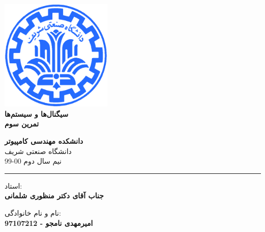 \documentclass[12pt]{article}
\begin{document}
\begin{titlepage}
\begin{center}
        
\vspace*{0.7cm}

\includegraphics[width=0.4\textwidth]{sharif1.png}\\
\vspace{0.5cm}
\textbf{ \Huge{\emph ‌سیگنال‌ها و سیستم‌ها} }\\
\vspace{0.5cm}
\textbf{ \Large{ تمرین سوم} }
\vspace{0.2cm}
       
 
      \large \textbf{دانشکده مهندسی کامپیوتر}\\\vspace{0.2cm}
    \large   دانشگاه صنعتی شریف\\\vspace{0.2cm}
       \large   ﻧﯿﻢ سال دوم 00-99 \\\vspace{0.2cm}
      \noindent\rule[1ex]{\linewidth}{1pt}
استاد:\\
    \textbf{{جناب آقای دکتر منظوری شلمانی}}


    \vspace{0.15cm}
نام و نام خانوادگی:\\

       
    \textbf{{امیرمهدی نامجو - 97107212}}
\end{center}
\end{titlepage}


\newpage
\pagestyle{fancy}
\fancyhf{}
\fancyfoot{}
\cfoot{\thepage}
\end{document}
